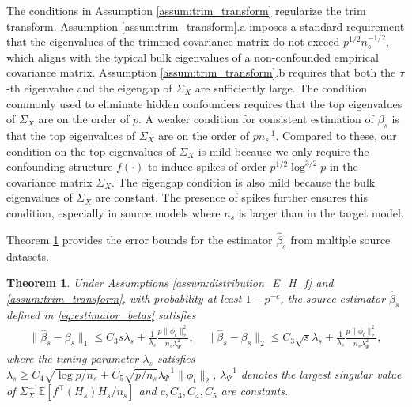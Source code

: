 \documentclass[12pt]{article}
\newtheorem{thm}{Theorem}
\begin{document}
The conditions in Assumption \ref{assum:trim_transform} regularize the trim transform. Assumption \ref{assum:trim_transform}.a imposes a standard requirement that the eigenvalues of the trimmed covariance matrix do not exceed $p^{1/2}n_s^{-1/2}$, which aligns with the typical bulk eigenvalues of a non-confounded empirical covariance matrix.
Assumption \ref{assum:trim_transform}.b requires that both the $\tau$-th eigenvalue and the eigengap of $\Sigma_X$ are sufficiently large. The condition commonly used to eliminate hidden confounders requires that the top eigenvalues of $\Sigma_X$ are on the order of $p$. A weaker condition for consistent estimation of $\beta_s$ is that the top eigenvalues of $\Sigma_X$ are on the order of $pn_s^{-1}$. Compared to these, our condition on the top eigenvalues of $\Sigma_X$ is mild because we only require the confounding structure $f(\cdot)$ to induce spikes of order $p^{1/2}\log^{3/2} p$ in the covariance matrix $\Sigma_X$. The eigengap condition is also mild because the bulk eigenvalues of $\Sigma_X$ are constant. The presence of spikes further ensures this condition, especially in source models where $n_s$ is larger than in the target model.

Theorem \ref{thm:upper_bound_of_betas} provides the error bounds for the estimator $\hat{\beta}_s$ from multiple source datasets. 
 \begin{thm}
     \label{thm:upper_bound_of_betas}
     Under Assumptions \ref{assum:distribution_E_H_f} and \ref{assum:trim_transform}, with probability at least $1-p^{-c}$, the source estimator $\hat{\beta}_s$ defined in \eqref{eq:estimator_betas} satisfies 
     \begin{align}
     \label{eq:thm:source_bound}
            \|\hat{\beta}_s - \beta_s\|_1  \le C_3 s\lambda_s + \frac{1}{\lambda_s} \frac{p\|\phi_t\|_2^2}{n_s \lambda_\Psi^2},\quad \|\hat{\beta}_s - \beta_s\|_2  \le C_3 \sqrt{s}\lambda_s + \frac{1}{\lambda_s}\frac{p\|\phi_t\|_2^2}{n_s \lambda_\Psi^2},
        \end{align}
        where the tuning parameter $\lambda_s$ satisfies $\lambda_s \ge C_4 \sqrt{\log p/n_s} +C_5 \sqrt{p/n_s}\lambda_\Psi^{-1}\|\phi_t\|_2$, $\lambda^{-1}_\Psi$ denotes the largest singular value of $\Sigma_X^{-1}\mathbb{E}[f^\top(H_s)H_s/n_s]$ and $c,C_3,C_4,C_5$ are constants. 
 \end{thm}

\end{document}
